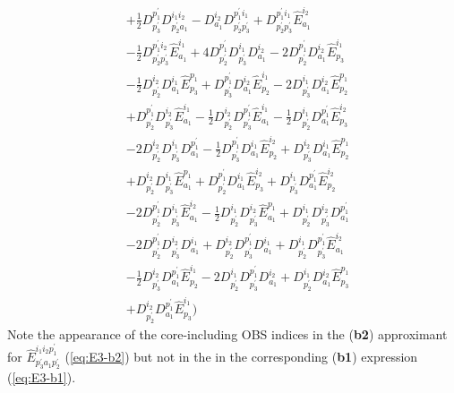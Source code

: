 \documentclass[aip,onecolumn,preprint]{revtex4-1}
\begin{document}
\begin{align}
  & + {{{\frac{1}{2}}}{D^{{p^{\prime}_1}}_{{p^{\prime}_3}}}{D^{{i_1}{i_2}}_{{p^{\prime}_2}{a_1}}}} - {{D^{{i_2}}_{{a_1}}}{D^{{p^{\prime}_1}{i_1}}_{{p^{\prime}_2}{p^{\prime}_3}}}} + {{D^{{p^{\prime}_1}{i_1}}_{{p^{\prime}_2}{p^{\prime}_3}}}{\hat{E}^{{i_2}}_{{a_1}}}} \nonumber \\
  & - {{{\frac{1}{2}}}{D^{{p^{\prime}_1}{i_2}}_{{p^{\prime}_2}{p^{\prime}_3}}}{\hat{E}^{{i_1}}_{{a_1}}}} + {{{4}}{D^{{p^{\prime}_1}}_{{p^{\prime}_2}}}{D^{{i_1}}_{{p^{\prime}_3}}}{D^{{i_2}}_{{a_1}}}} - {{{2}}{D^{{p^{\prime}_1}}_{{p^{\prime}_2}}}{D^{{i_2}}_{{a_1}}}{\hat{E}^{{i_1}}_{{p_3}}}} \nonumber \\
  & - {{{\frac{1}{2}}}{D^{{i_2}}_{{p^{\prime}_2}}}{D^{{i_1}}_{{a_1}}}{\hat{E}^{{p_1}}_{{p_3}}}}  + {{D^{{p^{\prime}_1}}_{{p^{\prime}_3}}}{D^{{i_2}}_{{a_1}}}{\hat{E}^{{i_1}}_{{p_2}}}} - {{{2}}{D^{{i_1}}_{{p^{\prime}_3}}}{D^{{i_2}}_{{a_1}}}{\hat{E}^{{p_1}}_{{p_2}}}} \nonumber \\
  & + {{D^{{p^{\prime}_1}}_{{p^{\prime}_2}}}{D^{{i_2}}_{{p^{\prime}_3}}}{\hat{E}^{{i_1}}_{{a_1}}}} - {{{\frac{1}{2}}}{D^{{i_2}}_{{p^{\prime}_2}}}{D^{{p^{\prime}_1}}_{{p^{\prime}_3}}}{\hat{E}^{{i_1}}_{{a_1}}}} - {{{\frac{1}{2}}}{D^{{i_1}}_{{p^{\prime}_2}}}{D^{{p^{\prime}_1}}_{{a_1}}}{\hat{E}^{{i_2}}_{{p_3}}}} \nonumber \\
  & - {{{2}}{D^{{i_2}}_{{p^{\prime}_2}}}{D^{{i_1}}_{{p^{\prime}_3}}}{D^{{p^{\prime}_1}}_{{a_1}}}} - {{{\frac{1}{2}}}{D^{{p^{\prime}_1}}_{{p^{\prime}_3}}}{D^{{i_1}}_{{a_1}}}{\hat{E}^{{i_2}}_{{p_2}}}} + {{D^{{i_2}}_{{p^{\prime}_3}}}{D^{{i_1}}_{{a_1}}}{\hat{E}^{{p_1}}_{{p_2}}}} \nonumber \\
  & + {{D^{{i_2}}_{{p^{\prime}_2}}}{D^{{i_1}}_{{p^{\prime}_3}}}{\hat{E}^{{p_1}}_{{a_1}}}} + {{D^{{p^{\prime}_1}}_{{p^{\prime}_2}}}{D^{{i_1}}_{{a_1}}}{\hat{E}^{{i_2}}_{{p_3}}}} + {{D^{{i_1}}_{{p^{\prime}_3}}}{D^{{p^{\prime}_1}}_{{a_1}}}{\hat{E}^{{i_2}}_{{p_2}}}} \nonumber \\
  & - {{{2}}{D^{{p^{\prime}_1}}_{{p^{\prime}_2}}}{D^{{i_1}}_{{p^{\prime}_3}}}{\hat{E}^{{i_2}}_{{a_1}}}} - {{{\frac{1}{2}}}{D^{{i_1}}_{{p^{\prime}_2}}}{D^{{i_2}}_{{p^{\prime}_3}}}{\hat{E}^{{p_1}}_{{a_1}}}} + {{D^{{i_1}}_{{p^{\prime}_2}}}{D^{{i_2}}_{{p^{\prime}_3}}}{D^{{p^{\prime}_1}}_{{a_1}}}} \nonumber \\
  & - {{{2}}{D^{{p^{\prime}_1}}_{{p^{\prime}_2}}}{D^{{i_2}}_{{p^{\prime}_3}}}{D^{{i_1}}_{{a_1}}}} + {{D^{{i_2}}_{{p^{\prime}_2}}}{D^{{p^{\prime}_1}}_{{p^{\prime}_3}}}{D^{{i_1}}_{{a_1}}}} + {{D^{{i_1}}_{{p^{\prime}_2}}}{D^{{p^{\prime}_1}}_{{p^{\prime}_3}}}{\hat{E}^{{i_2}}_{{a_1}}}} \nonumber \\
  & - {{{\frac{1}{2}}}{D^{{i_2}}_{{p^{\prime}_3}}}{D^{{p^{\prime}_1}}_{{a_1}}}{\hat{E}^{{i_1}}_{{p_2}}}} - {{{2}}{D^{{i_1}}_{{p^{\prime}_2}}}{D^{{p^{\prime}_1}}_{{p^{\prime}_3}}}{D^{{i_2}}_{{a_1}}}} + {{D^{{i_1}}_{{p^{\prime}_2}}}{D^{{i_2}}_{{a_1}}}{\hat{E}^{{p_1}}_{{p_3}}}} \nonumber \\
  & + {{D^{{i_2}}_{{p^{\prime}_2}}}{D^{{p^{\prime}_1}}_{{a_1}}}{\hat{E}^{{i_1}}_{{p_3}}}}\bigg)
  \end{align}
Note the appearance of the core-including OBS indices in the ({\bf b2}) approximant for $\hat{E}_{p^{\prime}_{3}a_{1}p^{\prime}_{2}}^{i_1 i_2 p^{\prime}_1}$ (\cref{eq:E3-b2}) but not in the in the corresponding ({\bf b1}) expression (\cref{eq:E3-b1}).


\end{document}
